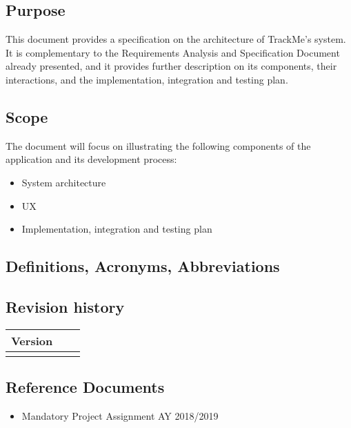 \documentclass[../main.tex]{subfiles}
\begin{document}
\subsection{Purpose}

This document provides a specification on the architecture of TrackMe's system. It is complementary to the Requirements Analysis and Specification Document already presented, and it provides further description on its components, their interactions, and the implementation, integration and testing plan.

\subsection{Scope}

The document will focus on illustrating the following components of the application and its development process:

\begin{itemize}

	\item{System architecture} %
	\item{UX} %
	\item{Implementation, integration and testing plan} %

\end{itemize}

\subsection{Definitions, Acronyms, Abbreviations}

\subsection{Revision history}
\begin{tabular}{p{1.2cm}|p{2.1cm}|p{2.6cm}}
	\bf Version & \bf \makebox[2.1cm][c]{Release Date} & \bf \makebox[3cm][c]{Description} \\
	\hline
	\makebox[1.2cm][c]{1.0} & \makebox[2.1cm][c]{10/12/2018} & \makebox[3cm][c]{Initial Release}\\
\end{tabular}

\subsection{Reference Documents}

\begin{itemize}

	\item{Mandatory Project Assignment AY 2018/2019}

\end{itemize}
\end{document}
